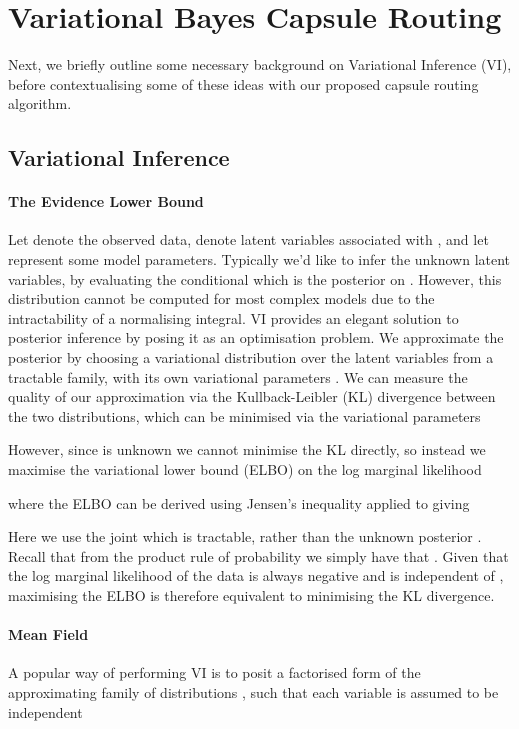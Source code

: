 \documentclass[letterpaper]{article} \usepackage{aaai20}  \usepackage{times}  \usepackage{helvet} \usepackage{courier}  \usepackage[hyphens]{url}  \usepackage{graphicx} \urlstyle{rm} \def\UrlFont{\rm}  \usepackage{graphicx}  \frenchspacing  \setlength{\pdfpagewidth}{8.5in}  \setlength{\pdfpageheight}{11in}  \nocopyright
\begin{document}
\section{Variational Bayes Capsule Routing}\label{sec: Variational Bayes Routing}
Next, we briefly outline some necessary background on Variational Inference (VI), before contextualising some of these ideas with our proposed capsule routing algorithm.
\subsection{Variational Inference}\label{subsec: Variational Inference}
\paragraph{The Evidence Lower Bound} Let  denote the observed data,  denote latent variables associated with , and let  represent some model parameters. Typically we'd like to infer the unknown latent variables, by evaluating the conditional  which is the posterior on . However, this distribution cannot be computed for most complex models due to the intractability of a normalising integral. VI provides an elegant solution to posterior inference by posing it as an optimisation problem. We approximate the posterior  by choosing a variational distribution over the latent variables  from a tractable family, with its own variational parameters . We can measure the quality of our approximation via the Kullback-Leibler (KL) divergence  between the two distributions, which can be minimised via the variational parameters 

However, since  is unknown we cannot minimise the KL directly, so instead we maximise the variational lower bound (ELBO) on the log marginal likelihood 

where the ELBO can be derived using Jensen's inequality  applied to  giving 

Here we use the joint  which is tractable, rather than the unknown posterior . Recall that from the product rule of probability we simply have that . Given that the log marginal likelihood of the data  is always negative and is independent of , maximising the ELBO is therefore equivalent to minimising the KL divergence.
\paragraph{Mean Field}
A popular way of performing VI is to posit a factorised form of the approximating family of distributions , such that each variable is assumed to be independent
\end{document}
